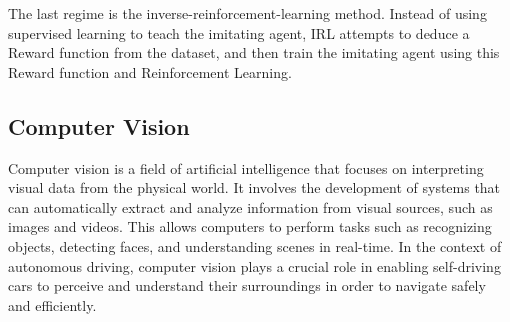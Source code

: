 The last regime is the \acrfull{inverse-reinforcement-learning} method.
Instead of using supervised learning to teach the imitating agent,
IRL attempts to deduce a Reward function from the dataset,
and then train the imitating agent using this Reward function and Reinforcement Learning.

\subsection{Computer Vision}
Computer vision is a field of artificial intelligence that focuses on interpreting visual data from the physical world. It involves the development of systems that can automatically extract and analyze information from visual sources, such as images and videos. This allows computers to perform tasks such as recognizing objects, detecting faces, and understanding scenes in real-time. In the context of autonomous driving, computer vision plays a crucial role in enabling self-driving cars to perceive and understand their surroundings in order to navigate safely and efficiently.

